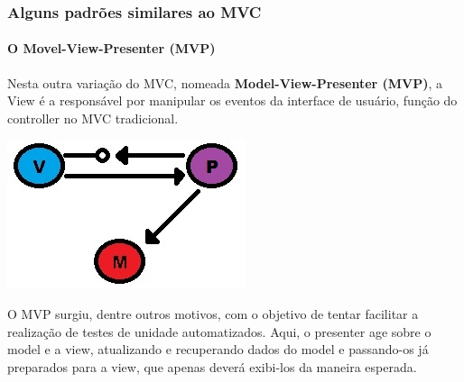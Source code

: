 \documentclass{beamer}
\begin{document}
\begin{frame}
\frametitle{Alguns padrões similares ao MVC}
\framesubtitle{O Movel-View-Presenter (MVP)}
	Nesta outra variação do MVC, nomeada \textbf{Model-View-Presenter (MVP)}, a View é a responsável por manipular os eventos da interface de usuário, função do controller no MVC tradicional.
	\begin{center}
		\includegraphics[scale=0.4]{MVP.jpg}
	\end{center}
	O MVP surgiu, dentre outros motivos, com o objetivo de tentar facilitar a realização de testes de unidade automatizados. Aqui, o presenter age sobre o model
	e a view, atualizando e recuperando dados do model e passando-os já preparados para a view, que apenas deverá exibi-los da maneira esperada.
\end{frame}
\end{document}

